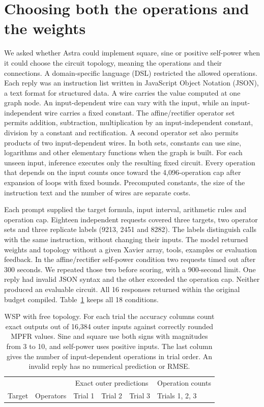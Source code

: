 \section{Choosing both the operations and the weights}\label{app:synthesis}
We asked whether Astra could implement square, sine or positive self-power when it could choose the circuit topology, meaning the operations and their connections. A domain-specific language (DSL) restricted the allowed operations. Each reply was an instruction list written in JavaScript Object Notation (JSON), a text format for structured data. A wire carries the value computed at one graph node. An input-dependent wire can vary with the input, while an input-independent wire carries a fixed constant. The affine/rectifier operator set permits addition, subtraction, multiplication by an input-independent constant, division by a constant and rectification. A second operator set also permits products of two input-dependent wires. In both sets, constants can use sine, logarithms and other elementary functions when the graph is built. For each unseen input, inference executes only the resulting fixed circuit. Every operation that depends on the input counts once toward the 4,096-operation cap after expansion of loops with fixed bounds. Precomputed constants, the size of the instruction text and the number of wires are separate costs.

Each prompt supplied the target formula, input interval, arithmetic rules and operation cap. Eighteen independent requests covered three targets, two operator sets and three replicate labels (9213, 2451 and 8282). The labels distinguish calls with the same instruction, without changing their inputs. The model returned weights and topology without a given Xavier array, tools, examples or evaluation feedback. In the affine/rectifier self-power condition two requests timed out after 300 seconds. We repeated those two before scoring, with a 900-second limit. One reply had invalid JSON syntax and the other exceeded the operation cap. Neither produced an evaluable circuit. All 16 responses returned within the original budget compiled. Table~\ref{tab:circuit-synthesis} keeps all 18 conditions.

\begin{table}[htbp]
\centering\small\setlength{\tabcolsep}{4pt}
\caption{WSP with free topology. For each trial the accuracy columns count exact outputs out of 16,384 outer inputs against correctly rounded MPFR values. Sine and square use both signs with magnitudes from 3 to 10, and self-power uses positive inputs. The last column gives the number of input-dependent operations in trial order. An invalid reply has no numerical prediction or RMSE.}
\label{tab:circuit-synthesis}
\begin{tabular}{@{}llrrrl@{}}\toprule
& & \multicolumn{3}{c}{Exact outer predictions} & Operation counts\\
Target & Operators & Trial 1 & Trial 2 & Trial 3 & Trials 1, 2, 3\\\midrule
\end{tabular}
\end{table}

